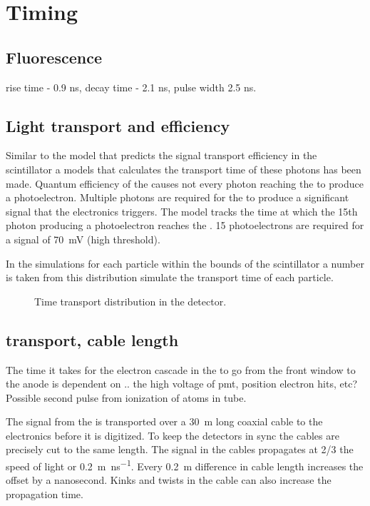 \section{Timing}

\subsection{Fluorescence}

rise time - 0.9 ns, decay time - 2.1 ns, pulse width 2.5 ns.



\subsection{Light transport and \pmt efficiency}

Similar to the model that predicts the signal transport efficiency in
the scintillator a models that calculates the transport time of these
photons has been made. Quantum efficiency of the \pmt causes not every
photon reaching the \pmt to produce a photoelectron. Multiple photons
are required for the \pmt to produce a significant signal that the
\hisparc electronics triggers. The model tracks the time at which the
15th photon producing a photoelectron reaches the \pmt. 15
photoelectrons are required for a signal of \SI{70}{\milli\volt} (high
threshold).

In the simulations for each particle within the bounds of the
scintillator a number is taken from this distribution simulate the
transport time of each particle.

\begin{figure}
    \centering
    
    \caption{ Time transport
             distribution in the detector.}
    \label{fig:transport_time}
\end{figure}


\subsection{\pmt transport, cable length}

The time it takes for the electron cascade in the \pmt to go from the
front window to the anode is dependent on .. the high voltage of pmt,
position electron hits, etc? Possible second pulse from ionization of
atoms in tube.

The signal from the \pmt is transported over a \SI{30}{\meter} long
coaxial cable to the \hisparc electronics before it is digitized. To
keep the detectors in sync the cables are precisely cut to the
same length. The signal in the cables propagates at 2/3 the speed of
light or \SI{.2}{\meter\per\ns}. Every \SI{.2}{\meter}
difference in cable length increases the offset by a nanosecond. Kinks
and twists in the cable can also increase the propagation time.

